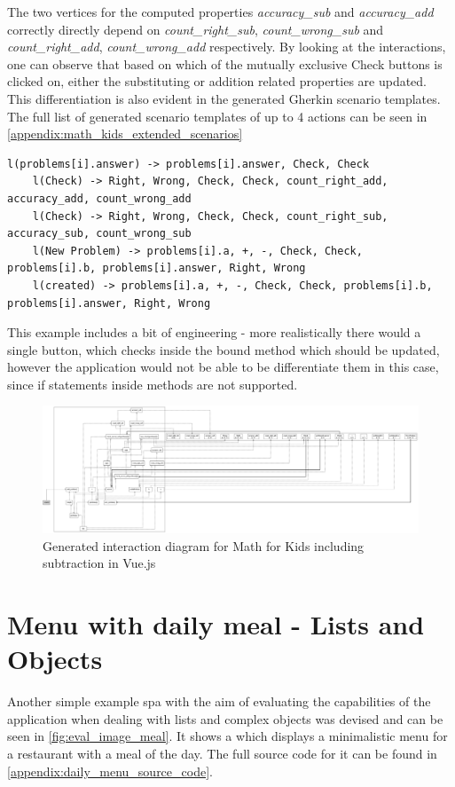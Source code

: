 The two vertices for the computed properties \textit{accuracy\_sub} and \textit{accuracy\_add} correctly directly depend on \textit{count\_right\_sub}, \textit{count\_wrong\_sub} and \textit{count\_right\_add}, \textit{count\_wrong\_add} respectively. By looking at the interactions, one can observe that based on which of the mutually exclusive Check buttons is clicked on, either the substituting or addition related properties are updated. This differentiation is also evident in the generated Gherkin scenario templates. The full list of generated scenario templates of up to 4 actions can be seen in  \ref{appendix:math_kids_extended_scenarios}
\begin{lstlisting}[language=JavaScriptPlain]
    l(problems[i].answer) -> problems[i].answer, Check, Check
    l(Check) -> Right, Wrong, Check, Check, count_right_add, accuracy_add, count_wrong_add
    l(Check) -> Right, Wrong, Check, Check, count_right_sub, accuracy_sub, count_wrong_sub
    l(New Problem) -> problems[i].a, +, -, Check, Check, problems[i].b, problems[i].answer, Right, Wrong
    l(created) -> problems[i].a, +, -, Check, Check, problems[i].b, problems[i].answer, Right, Wrong
    \end{lstlisting}
This example includes a bit of engineering - more realistically there would a single button, which checks inside the bound method which should be updated, however the application would not be able to be differentiate them in this case, since if statements inside methods are not supported. 
\begin{figure}[H]
    \centering
    \includegraphics[width=\textwidth]{images/diagram_list_add_sub.png}
     \caption{Generated interaction diagram for Math for Kids including subtraction in Vue.js}
     \label{fig:diagram_list_complex}
\end{figure}





\section{Menu with daily meal - Lists and Objects}
Another simple example \gls{spa} with the aim of evaluating the capabilities of the application when dealing with lists and complex objects was devised and can be seen in \ref{fig:eval_image_meal}. It shows a which displays a minimalistic menu for a restaurant with a meal of the day. The full source code for it can be found in \ref{appendix:daily_menu_source_code}.

